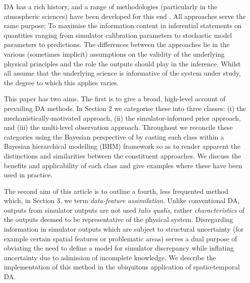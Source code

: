 \documentclass[10pt,a4paper]{article}
\begin{document}
DA has a rich history, and a range of methodologies (particularly in the atmospheric sciences) have been developed for this end \citep[e.g.][]{Houtekamer_1998,Kalnay_2003,Reese_2004}. All approaches serve the same purpose: To maximise the information content in inferential statements on quantities ranging from simulator calibration parameters to stochastic model parameters to predictions.  The differences between the approaches lie in the various (sometimes implicit) assumptions on the validity of the underlying physical principles and the role the outputs should play in the inference. Whilst all assume that the underlying science is informative of the system under study, the degree to which this applies varies. 

This paper has two aims. The first is to give a broad, high-level account of prevailing DA methods. In Section 2 we categorise these into three classes: (i) the mechanistically-motivated approach, (ii) the simulator-informed prior approach, and (iii) the multi-level observation approach.  Throughout we reconcile these categories using the Bayesian perspective of \cite{Wikle_2007} by casting each class within a Bayesian hierarchical modelling (BHM) framework so as to render apparent the distinctions and similarities between the constituent approaches. We discuss the benefits and applicability of each class and give examples where these have been used in practice.


The second aim of this article is to outline a fourth, less frequented method which, in Section 3, we term \emph{data-feature assimilation}. Unlike conventional DA, outputs from simulator outputs are not used \emph{talis qualis}, rather \emph{characteristics} of the outputs deemed to be representative of the physical system. Disregarding information in simulator outputs which are subject to structural uncertainty (for example certain spatial features or problematic areas) serves a dual purpose of obviating the need to define a model for simulator discrepancy while inflating uncertainty due to admission of incomplete knowledge.  We describe the implementation of this method in the ubiquitous application of spatio-temporal DA.
\end{document}
